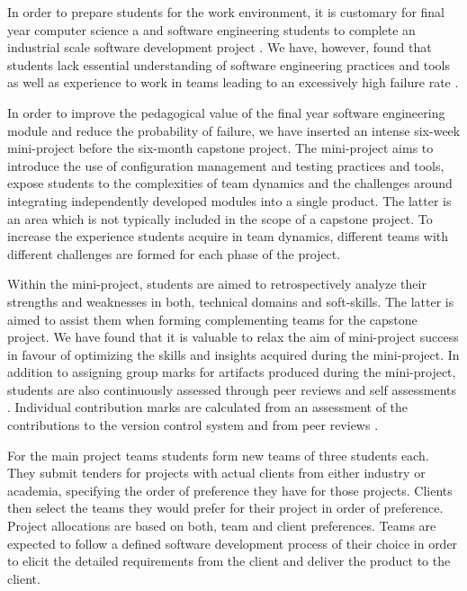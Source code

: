 In order to prepare students for the work environment, it is customary for final year computer science  a and software engineering students to complete an industrial scale software development project \cite{oudshoorn_ExperienceWithAProjectBasedApproachToTeachingSoftwareEngineering_1994,roach_retrospectivesInASoftwareEngineeringProjectCourse_2011}. We have, however, found that students lack essential understanding of software engineering practices and tools as well as experience to work in teams leading to an excessively high failure rate \cite{}. 

In order to improve the pedagogical value of the final year software engineering module and reduce the probability of failure, we have inserted an intense six-week mini-project before the six-month capstone project\cite{vredasPapers,desai_aNovelAproachToCarryingOutMiniProjectInComputerScienceAndEngineering_2012}. The mini-project aims to introduce the use of configuration management and testing practices and tools, expose students to the complexities of team dynamics and the challenges around integrating independently developed modules into a single product. The latter is an area which is not typically included in the scope of a capstone project. To increase the experience students acquire in team dynamics, different teams with different challenges are formed for each phase of the project\cite{vredasPersonalityTraitsPaper}.

Within the mini-project, students are aimed to retrospectively analyze their strengths and weaknesses in both, technical domains and soft-skills\cite{roach_retrospectivesInASoftwareEngineeringProjectCourse_2011}. The latter is aimed to assist them when forming complementing teams for the capstone project. We have found that it is valuable to relax the aim of mini-project success in favour of optimizing the skills and insights acquired during the mini-project. In addition to assigning group marks for artifacts produced during the mini-project, students are also continuously assessed through peer reviews and self assessments \cite{clark_selfAndPeerAssessmentInSoftwareEngineeringProjects_2005}. Individual contribution marks are calculated from an assessment of the contributions to the version control system and from peer reviews \cite{hayes_evaluatingIndividualContributionTowardGroupSoftwareEngineeringProjects_2003}.

For the main project teams students form new teams of three students each. They submit tenders for projects with actual clients from either industry or academia, specifying the order of preference they have for those projects. Clients then select the teams they would prefer for their project in order of preference. Project allocations are based on both, team and client preferences. Teams are expected to follow a defined software development process of their choice in order to elicit the detailed requirements from the client and deliver the product to the client.

